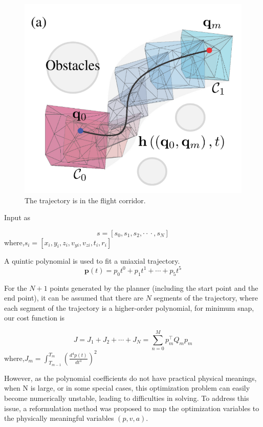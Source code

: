 \documentclass[times,authoryear]{elsarticle}
\begin{document}
\begin{figure}[htp]
	\centering
	\includegraphics[scale=0.4]{img/coorid.png}
	\caption{The trajectory is in the flight corridor.}
	\label{fig2}
\end{figure}

Input as

\begin{equation}
	s = [s_{0},s_{1},s_{2},\cdot{}\cdot{}\cdot{},s_{N}]
\end{equation}
where,$s_{i} = [x_{i},y_{i},z_{i},v_{yi},v_{zi},t_{i},r_{i}]$

A quintic polynomial is used to fit a uniaxial trajectory.
\begin{equation}
	\boldsymbol{p}\left( {t}\right)= {p}_{0} {t}^{0}+ {p}_{1} {t}^{1}+\cdots+ {p}_{5} {t}^{5}
\end{equation}

For the $N+1$ points generated by the planner (including the start point and the end point), it can be assumed that there are $N$ segments of the trajectory, where each segment of the trajectory is a higher-order polynomial, for minimum snap, our cost function is

\begin{equation}
	J= J_{1}+J_{2}+\cdots+J_{N} = \sum_{n=0}^M p_{m}^\top Q_{m}p_{m}
\end{equation}
where,$J_{m} = \int^{T_{m}}_{{T_{m-1}}}\left( \frac{d^4p(t)}{dt^4} \right)^2$

However, as the polynomial coefficients do not have practical physical meanings, when N is large, or in some special cases, this optimization problem can easily become numerically unstable, leading to difficulties in solving. To address this issue, a reformulation method was proposed to map the optimization variables to the physically meaningful variables $(p,v,a)$.
\end{document}
